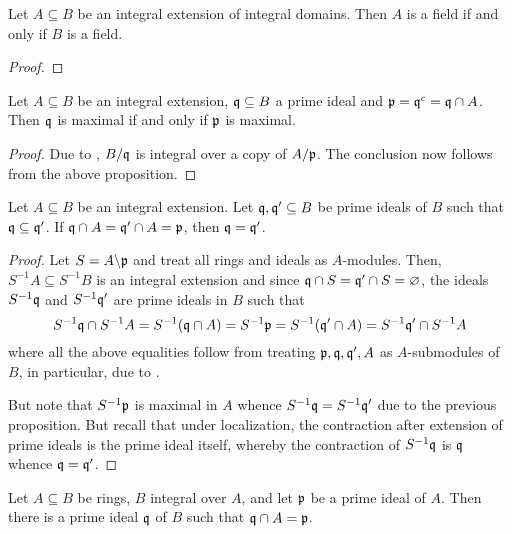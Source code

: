 \begin{proposition}
    Let $A\subseteq B$ be an integral extension of integral domains. Then $A$ is a field if and only if $B$ is a field.
\end{proposition}
\begin{proof}
\end{proof}

\begin{proposition}
    Let $A\subseteq B$ be an integral extension, $\mathfrak q\subseteq B$ a prime ideal and $\mathfrak p = \mathfrak q^c = \mathfrak q\cap A$. Then $\mathfrak q$ is maximal if and only if $\mathfrak p$ is maximal.
\end{proposition}
\begin{proof}
    Due to , $B/\mathfrak q$ is integral over a copy of $A/\mathfrak p$. The conclusion now follows from the above proposition.
\end{proof}

\begin{proposition}
    Let $A\subseteq B$ be an integral extension. Let $\mathfrak q,\mathfrak q'\subseteq B$ be prime ideals of $B$ such that $\mathfrak q\subseteq\mathfrak q'$. If $\mathfrak q\cap A = \mathfrak q'\cap A = \mathfrak p$, then $\mathfrak q = \mathfrak q'$.
\end{proposition}
\begin{proof}
    Let $S = A\backslash\mathfrak p$ and treat all rings and ideals as $A$-modules. Then, $S^{-1}A\subseteq S^{-1}B$ is an integral extension and since $\mathfrak q\cap S = \mathfrak q'\cap S = \varnothing$, the ideals $S^{-1}\mathfrak q$ and $S^{-1}\mathfrak q'$ are prime ideals in $B$ such that 
    \begin{equation*}
        S^{-1}\mathfrak q\cap S^{-1}A = S^{-1}(\mathfrak q\cap A) = S^{-1}\mathfrak p = S^{-1}(\mathfrak q'\cap A) = S^{-1}\mathfrak q'\cap S^{-1}A
    \end{equation*}
    where all the above equalities follow from treating $\mathfrak p,\mathfrak q,\mathfrak q',A$ as $A$-submodules of $B$, in particular, due to .

    But note that $S^{-1}\mathfrak p$ is maximal in $A$ whence $S^{-1}\mathfrak q = S^{-1}\mathfrak q'$ due to the previous proposition. But recall that under localization, the contraction after extension of prime ideals is the prime ideal itself, whereby the contraction of $S^{-1}\mathfrak q$ is $\mathfrak q$ whence $\mathfrak q = \mathfrak q'$.
\end{proof}

\begin{lemma}
    Let $A\subseteq B$ be rings, $B$ integral over $A$, and let $\mathfrak p$ be a prime ideal of $A$. Then there is a prime ideal $\mathfrak q$ of $B$ such that $\mathfrak q\cap A = \mathfrak p$.
\end{lemma}

